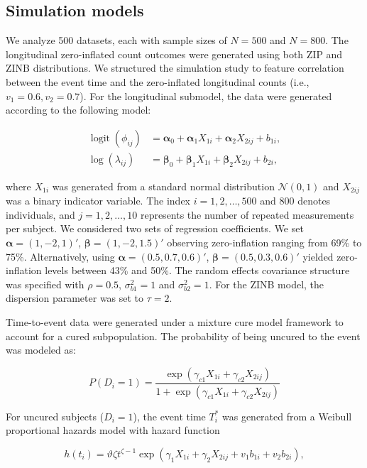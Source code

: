 \documentclass[twoside]{article}
\begin{document}
\subsection{Simulation models}

We analyze 500 datasets, each with sample sizes of \( N = 500 \) and \( N = 800 \). The longitudinal zero-inflated count outcomes were generated using both ZIP and ZINB distributions. We structured the simulation study to feature correlation between the event time and the zero-inflated longitudinal counts (i.e., \( v_1 = 0.6, v_2 = 0.7 \)). For the longitudinal submodel, the data were generated according to the following model:

\begin{align*}
\operatorname{logit}(\phi_{ij}) &= \bm{\alpha}_0 + \bm{\alpha}_1 X_{1i} + \bm{\alpha}_2 X_{2ij} + b_{1i},\\
\log(\lambda_{ij}) &= \bm{\beta}_0 + \bm{\beta}_1 X_{1i} + \bm{\beta}_2 X_{2ij} + b_{2i},
\end{align*}



where \( X_{1i} \) was generated from a standard normal distribution \( \mathcal{N}(0, 1) \) and \( X_{2ij} \) was a binary indicator variable. The index \( i = 1, 2, \dots, 500 \) and \( 800 \) denotes individuals, and \( j = 1, 2, \dots, 10 \) represents the number of repeated measurements per subject. We considered two sets of regression coefficients. We set \( \bm{\alpha} = (1, -2, 1)' \), \( \bm{\beta} = (1, -2, 1.5)' \) observing zero-inflation ranging from 69\% to 75\%. Alternatively, using \( \bm{\alpha} = (0.5, 0.7, 0.6)' \), \( \bm{\beta} = (0.5, 0.3, 0.6)' \) yielded zero-inflation levels between 43\% and 50\%. The random effects covariance structure was specified with \( \rho = 0.5 \), \( \sigma^2_{b1} = 1 \) and \( \sigma^2_{b2} = 1 \). For the ZINB model, the dispersion parameter was set to \( \tau = 2 \).

Time-to-event data were generated under a mixture cure model framework to account for a cured subpopulation. The probability of being uncured to the event was modeled as:

\[
P(D_i = 1) = \frac{\exp(\gamma_{c1}X_{1i} + \gamma_{c2}X_{2ij})}{1 + \exp(\gamma_{c1}X_{1i} + \gamma_{c2}X_{2ij})}
\]

For uncured subjects (\( D_i = 1 \)), the event time \( T_i^* \) was generated from a Weibull proportional hazards model with hazard function

\[
h(t_i) = \vartheta \zeta t^{\zeta-1} \exp(\gamma_1 X_{1i} + \gamma_2 X_{2ij} + v_1 b_{1i} + v_2 b_{2i}),
\]
\end{document}

